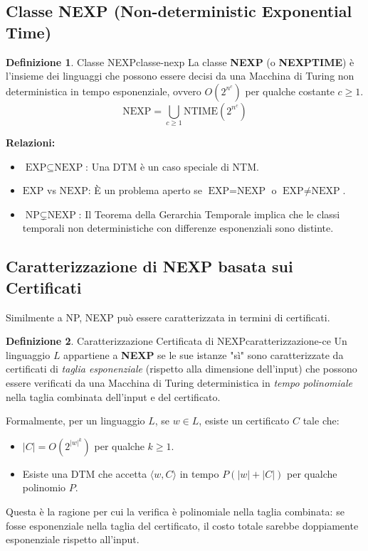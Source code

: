\documentclass[a4paper]{article}
\theoremstyle{definition} %
\newtheorem{definition}{Definizione}
\begin{document}
\subsection{Classe NEXP (Non-deterministic Exponential Time)}
\begin{definition}{Classe NEXP}{classe-nexp}
La classe \textbf{NEXP} (o \textbf{NEXPTIME}) è l'insieme dei linguaggi che possono essere decisi da una Macchina di Turing non deterministica in tempo esponenziale, ovvero $O(2^{n^c})$ per qualche costante $c \ge 1$.
\[
\text{NEXP} = \bigcup_{c \ge 1} \text{NTIME}(2^{n^c})
\]
\end{definition}

\textbf{Relazioni:}
\begin{itemize}
    \item $\text{EXP} \subseteq \text{NEXP}$: Una DTM è un caso speciale di NTM.
    \item $\text{EXP}$ vs $\text{NEXP}$: È un problema aperto se $\text{EXP} = \text{NEXP}$ o $\text{EXP} \neq \text{NEXP}$.
    \item $\text{NP} \subsetneq \text{NEXP}$: Il Teorema della Gerarchia Temporale implica che le classi temporali non deterministiche con differenze esponenziali sono distinte.
\end{itemize}

\subsection{Caratterizzazione di NEXP basata sui Certificati}
Similmente a NP, NEXP può essere caratterizzata in termini di certificati.
\begin{definition}{Caratterizzazione Certificata di NEXP}{caratterizzazione-ce}
Un linguaggio $L$ appartiene a \textbf{NEXP} se le sue istanze "sì" sono caratterizzate da certificati di \textit{taglia esponenziale} (rispetto alla dimensione dell'input) che possono essere verificati da una Macchina di Turing deterministica in \textit{tempo polinomiale} nella taglia combinata dell'input e del certificato.
\end{definition}
Formalmente, per un linguaggio $L$, se $w \in L$, esiste un certificato $C$ tale che:
\begin{itemize}
    \item $|C| = O(2^{|w|^k})$ per qualche $k \ge 1$.
    \item Esiste una DTM che accetta $\langle w, C \rangle$ in tempo $P(|w| + |C|)$ per qualche polinomio $P$.
\end{itemize}
Questa è la ragione per cui la verifica è polinomiale nella taglia combinata: se fosse esponenziale nella taglia del certificato, il costo totale sarebbe doppiamente esponenziale rispetto all'input.
\end{document}
